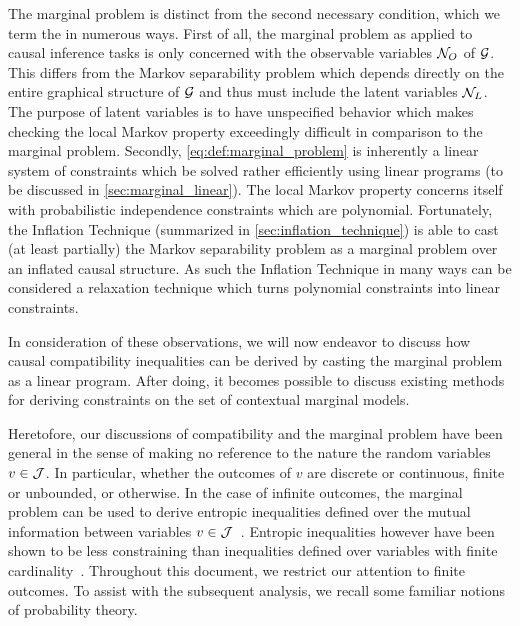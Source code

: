 \documentclass[aps, 10pt, english, twoside, pra, nofootinbib, tightenlines, longbibliography, superscriptaddress]{revtex4-1}
\begin{document}
    The marginal problem is distinct from the second necessary condition, which we term the  in numerous ways. First of all, the marginal problem as applied to causal inference tasks is only concerned with the observable variables $\mathcal{N}_{O}$ of $\mathcal{G}$. This differs from the Markov separability problem which depends directly on the entire graphical structure of $\mathcal{G}$ and thus must include the latent variables $\mathcal{N}_{L}$. The purpose of latent variables is to have unspecified behavior which makes checking the local Markov property exceedingly difficult in comparison to the marginal problem. Secondly, \cref{eq:def:marginal_problem} is inherently a linear system of constraints which be solved rather efficiently using linear programs (to be discussed in \cref{sec:marginal_linear}). The local Markov property concerns itself with probabilistic independence constraints which are polynomial. Fortunately, the Inflation Technique (summarized in \cref{sec:inflation_technique}) is able to cast (at least partially) the Markov separability problem as a marginal problem over an inflated causal structure. As such the Inflation Technique in many ways can be considered a relaxation technique which turns polynomial constraints into linear constraints.

    In consideration of these observations, we will now endeavor to discuss how causal compatibility inequalities can be derived by casting the marginal problem as a linear program. After doing, it becomes possible to discuss existing methods for deriving constraints on the set of contextual marginal models.

    Heretofore, our discussions of compatibility and the marginal problem have been general in the sense of making no reference to the nature the random variables $v \in \mathcal{J}$. In particular, whether the outcomes of $v$ are discrete or continuous, finite or unbounded, or otherwise. In the case of infinite outcomes, the marginal problem can be used to derive entropic inequalities defined over the mutual information between variables $v \in \mathcal{J}$~\cite{Fritz_2011}. Entropic inequalities however have been shown to be less constraining than inequalities defined over variables with finite cardinality~\cite{Inflation}. Throughout this document, we restrict our attention to finite outcomes. To assist with the subsequent analysis, we recall some familiar notions of probability theory.
\end{document}
